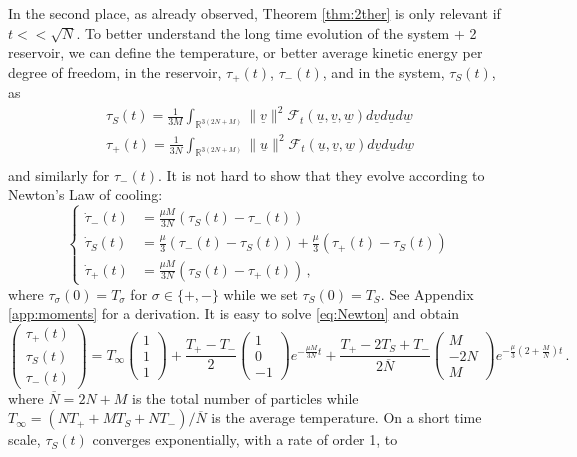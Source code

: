 \documentclass{article}
\def\red{}
\newcommand{\scrF}{{\mathscr F}}
\newcommand \ul[1]{\underline{#1}}
\newcommand\uv{{\underline v}}
\newcommand\uu{{\underline u}}
\newcommand\uw{{\underline w}}
\begin{document}
In the second place, as already observed, Theorem \ref{thm:2ther} is only relevant if $t<<\sqrt N$. To better
understand the long time evolution of the system + 2 reservoir, we can define the temperature, or better average
kinetic energy \red{per degree of freedom}, in the reservoir, $\tau_+(t)$, $\tau_-(t)$, and in the system, $\tau_S(t)$,
as
\[
\begin{aligned}
	\tau_S(t)=\frac1{3M}\int_{\mathds R^{3(2N+M)}}\|\uv\|^2 \scrF_t(\ul u,\ul v,\ul w)d\ul vd\ul u d\ul w\\
	\tau_+(t)=\frac 1{3N}\int_{\mathds R^{3(2N+M)}}\|\uu\|^2 \scrF_t(\ul u,\ul v,\ul w)d\ul vd\ul u d\ul w\\
\end{aligned}
\]
and similarly for $\tau_-(t)$. It is not hard to show that they evolve according to Newton's Law of cooling:
\begin{equation}\label{eq:Newton}
	\left\{
	\begin{aligned}
		\dot \tau_-(t)&=\frac{\mu M}{3N} (\tau_S(t) -  \tau_-(t))\\
		\dot \tau_S(t)&=\frac\mu3(\tau_-(t) -  \tau_S(t))+\frac\mu3(\tau_+(t) -  \tau_S(t))\\
		\dot \tau_+(t)&=\frac{\mu M}{3N}( \tau_S(t) - \tau_+(t))\, ,
	\end{aligned}
	\right.
\end{equation}
where $\tau_\sigma(0)=T_\sigma$ for $\sigma\in\{+,-\}$ while we set $\tau_S(0)=T_S$.
See Appendix \ref{app:moments} for a derivation. \red{It is easy to solve \eqref{eq:Newton} and obtain
\begin{equation}\label{eq:IVPsol}
	\begin{pmatrix}
		 \tau_+(t) \\ \tau_S(t) \\ \tau_-(t)
	\end{pmatrix}=T_\infty\begin{pmatrix}	1 \\ 1 \\ 1
\end{pmatrix}+
	\frac{T_+-T_-}2\begin{pmatrix}
		1 \\ 0 \\ -1
	\end{pmatrix} e^{-\frac {\mu M}{3N} t}+
	\frac{T_+-2T_S+T_-}{2\overline N}\begin{pmatrix}
		M \\ -2N \\ M
	\end{pmatrix}e^{-\frac \mu3\left(2+\frac MN\right)t}\, .
\end{equation}
where $\overline N=2N+M$ is the total number of particles while $T_\infty=(NT_++MT_S+NT_-)/\overline N$ is the
average temperature.} On a short time scale, $\tau_S(t)$ converges exponentially, with a rate of order 1, to
\end{document}
